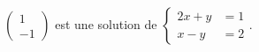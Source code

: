 $\begin{pmatrix}1\\-1\end{pmatrix}$ est une solution de $\begin{cases}2x+y &= 1 \\ x-y &= 2\end{cases}$.

\begin{reponses}
\end{reponses}

